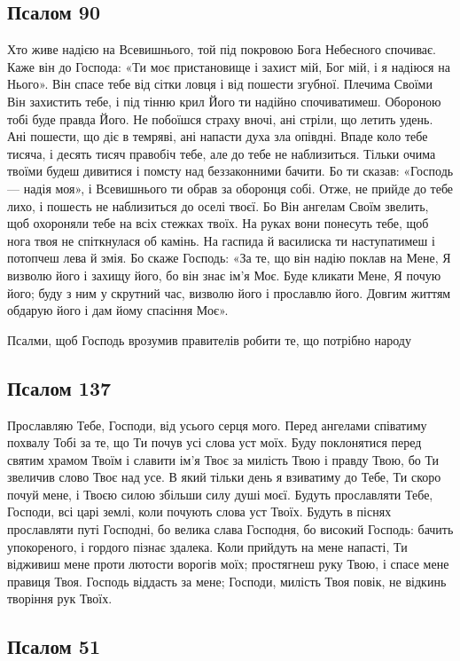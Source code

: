 \documentclass[chapters.tex]{subfiles}
\begin{document}
\subsection{Псалом 90}

Хто живе надією на Всевишнього, той під покровою Бога Небесного спочиває. Каже він до Господа: «Ти моє пристановище і захист мій, Бог мій, і я надіюся на Нього». Він спасе тебе від сітки ловця і від пошести згубної. Плечима Своїми Він захистить тебе, і під тінню крил Його ти надійно спочиватимеш. Обороною тобі буде правда Його. Не побоїшся страху вночі, ані стріли, що летить удень. Ані пошести, що діє в темряві, ані напасти духа зла опівдні. Впаде коло тебе тисяча, і десять тисяч правобіч тебе, але до тебе не наблизиться. Тільки очима твоїми будеш дивитися і помсту над беззаконними бачити. Бо ти сказав: «Господь — надія моя», і Всевишнього ти обрав за оборонця собі. Отже, не прийде до тебе лихо, і пошесть не наблизиться до оселі твоєї. Бо Він ангелам Своїм звелить, щоб охороняли тебе на всіх стежках твоїх. На руках вони понесуть тебе, щоб нога твоя не спіткнулася об камінь. На гаспида й василиска ти наступатимеш і потопчеш лева й змія. Бо скаже Господь: «За те, що він надію поклав на Мене, Я визволю його і захищу його, бо він знає ім’я Моє. Буде кликати Мене, Я почую його; буду з ним у скрутний час, визволю його і прославлю його. Довгим життям обдарую його і дам йому спасіння Моє».

Псалми, щоб Господь врозумив правителів робити те, що потрібно народу
\subsection{Псалом 137}

Прославляю Тебе, Господи, від усього серця мого. Перед ангелами співатиму похвалу Тобі за те, що Ти почув усі слова уст моїх. Буду поклонятися перед святим храмом Твоїм і славити ім’я Твоє за милість Твою і правду Твою, бо Ти звеличив слово Твоє над усе. В який тільки день я взиватиму до Тебе, Ти скоро почуй мене, і Твоєю силою збільши силу душі моєї. Будуть прославляти Тебе, Господи, всі царі землі, коли почують слова уст Твоїх. Будуть в піснях прославляти путі Господні, бо велика слава Господня, бо високий Господь: бачить упокореного, і гордого пізнає здалека. Коли прийдуть на мене напасті, Ти відживиш мене проти лютости ворогів моїх; простягнеш руку Твою, і спасе мене правиця Твоя. Господь віддасть за мене; Господи, милість Твоя повік, не відкинь творіння рук Твоїх.

\subsection{Псалом 51}
\end{document}
